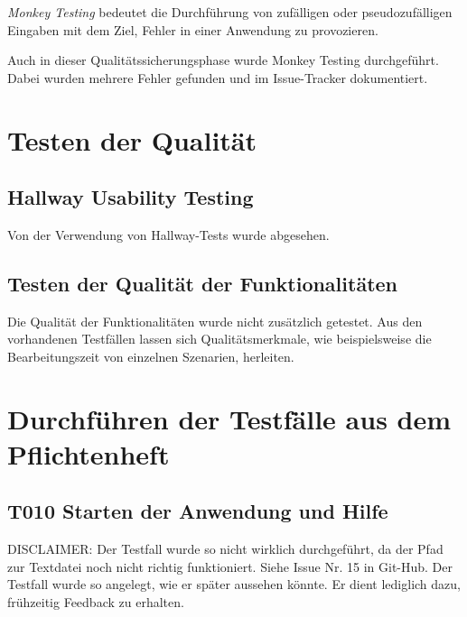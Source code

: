 \documentclass[parskip=full]{scrartcl}
\begin{document}
\textit{Monkey Testing} bedeutet die Durchführung von zufälligen oder pseudozufälligen Eingaben mit dem Ziel, Fehler in einer Anwendung zu provozieren.

Auch in dieser Qualitätssicherungsphase wurde Monkey Testing durchgeführt. Dabei wurden mehrere Fehler gefunden und im Issue-Tracker dokumentiert.



\clearpage
\section{Testen der Qualität} \label{quali}



\subsection{Hallway Usability Testing}
Von der Verwendung von Hallway-Tests wurde abgesehen.

\subsection{Testen der Qualität der Funktionalitäten}
Die Qualität der Funktionalitäten wurde nicht zusätzlich getestet. Aus den vorhandenen Testfällen lassen sich Qualitätsmerkmale, wie beispielsweise die Bearbeitungszeit von einzelnen Szenarien, herleiten.

\section{Durchführen der Testfälle aus dem Pflichtenheft} \label{testszenarien}

\subsection{\textbf{T010} Starten der Anwendung und Hilfe}

DISCLAIMER: Der Testfall wurde so nicht wirklich durchgeführt, da der Pfad zur Textdatei noch nicht richtig funktioniert. Siehe Issue Nr. 15 in Git-Hub. Der Testfall wurde so angelegt, wie er später aussehen könnte. Er dient lediglich dazu, frühzeitig Feedback zu erhalten.
\end{document}

